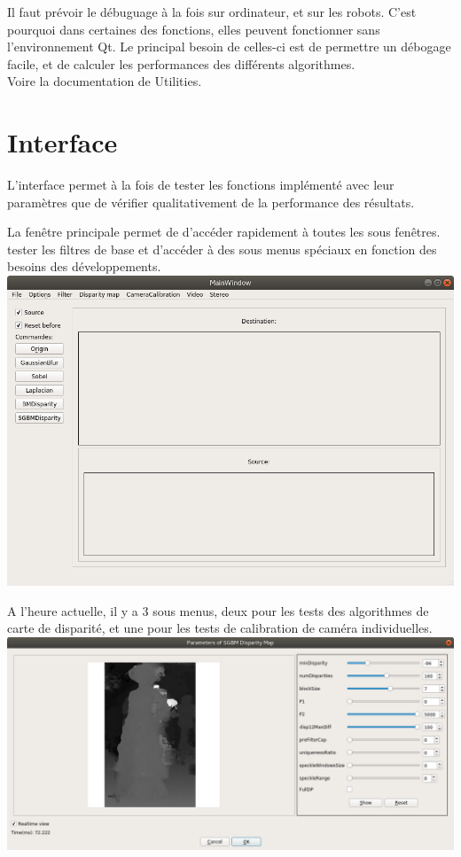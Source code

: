 \documentclass{article}
\begin{document}
Il faut prévoir le débuguage à la fois sur ordinateur, et sur les robots. C'est pourquoi dans certaines des fonctions, elles peuvent fonctionner sans l'environnement Qt.
Le principal besoin de celles-ci est de permettre un débogage facile, et de calculer les performances des différents algorithmes.\\

Voire la documentation de Utilities.\\

\par\leavevmode\par
\section{Interface}

L'interface permet à la fois de tester les fonctions implémenté avec leur paramètres que de vérifier qualitativement de la performance des résultats.

La fenêtre principale permet de d'accéder rapidement à toutes les sous fenêtres. tester les filtres de base et d'accéder à des sous menus spéciaux en fonction des besoins des développements.\\

\includegraphics[width=\linewidth]{img/interface.png}

A l'heure actuelle, il y a 3 sous menus, deux pour les tests des algorithmes de carte de disparité, et une pour les tests de calibration de caméra individuelles.\\

\includegraphics[width=\linewidth]{img/bm.png}\\
\end{document}
